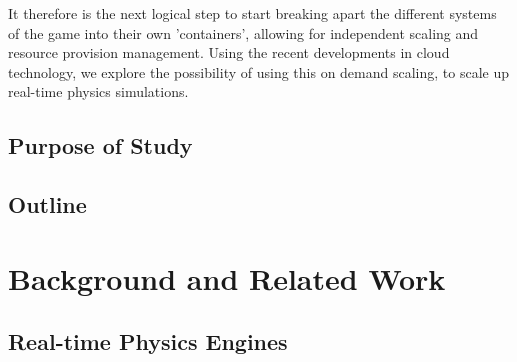 It therefore is the next logical step to start breaking apart the different systems of the game into their own 'containers', allowing for independent scaling and resource provision management.  
Using the recent developments in cloud technology, we explore the possibility of using this on demand scaling, to scale up real-time physics simulations.


\section{Purpose of Study}
\section{Outline}

\chapter{Background and Related Work}
\section{Real-time Physics Engines}




